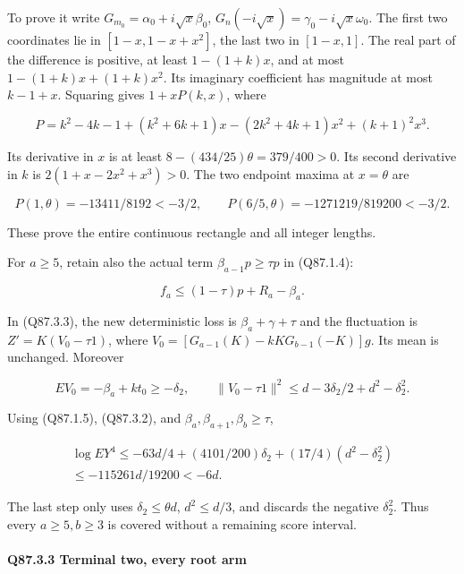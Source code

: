 To prove it write \(G_{m_0}=\allowbreak \alpha_0+i\sqrt x\beta_0\),
\(G_n(-i\sqrt x)=\allowbreak \gamma_0-i\sqrt x\omega_0\).
The first two coordinates lie in \([1-x,\allowbreak  1-x+x^2]\), the last
two in \([1-x,\allowbreak  1]\). The real part of the difference is positive,
at least \(1-(1+k)x\), and at most
\(1-(1+k)x+(1+k)x^2\). Its imaginary coefficient has magnitude
at most \(k-1+x\). Squaring gives \(1+xP(k,\allowbreak  x)\), where

\[
 P=k^2-4k-1+(k^2+6k+1)x
 -(2k^2+4k+1)x^2+(k+1)^2x^3.
\]

Its derivative in \(x\) is at least
\(8-(434/25)\theta=\allowbreak 379/400>\allowbreak 0\). Its second derivative in \(k\)
is \(2(1+x-2x^2+x^3)>\allowbreak 0\). The two endpoint maxima at \(x=\allowbreak \theta\)
are

\[
 P(1,\theta)=-13411/8192<-3/2,\qquad
 P(6/5,\theta)=-1271219/819200<-3/2.
\]

These prove the entire continuous rectangle and all integer lengths.

For \(a\ge\allowbreak 5\), retain also the actual term
\(\beta_{a-1}p\ge\allowbreak \tau p\) in (Q87.1.4):

\[
 f_a\le(1-\tau)p+R_a-\beta_a.
\]

In (Q87.3.3), the new deterministic loss is \(\beta_a+\gamma+\tau\)
and the fluctuation is \(Z'=\allowbreak K(V_0-\tau1)\), where
\(V_0=\allowbreak [G_{a-1}(K)-kKG_{b-1}(-K)]g\).
Its mean is unchanged. Moreover

\[
 EV_0=-\beta_a+kt_0\ge-\delta_2,\qquad
 \|V_0-\tau1\|^2\le d-3\delta_2/2+d^2-\delta_2^2.
\]

Using (Q87.1.5), (Q87.3.2), and \(\beta_a,\allowbreak  \beta_{a+1},\allowbreak  \beta_b\ge\allowbreak \tau\),

\[
\begin{gathered}
\log EY^4\le-63d/4+(4101/200)\delta_2+(17/4)(d^2-\delta_2^2)\\
\le-115261d/19200<-6d.
\end{gathered}\tag{Q87.3.6}\label{eq:Q87:3.6}
\]

The last step only uses \(\delta_2\le\allowbreak \theta d\), \(d^2\le\allowbreak  d/3\),
and discards the negative \(\delta_2^2\). Thus every \(a\ge\allowbreak 5,\allowbreak  b\ge\allowbreak 3\)
is covered without a remaining score interval.

\paragraph{Q87.3.3 Terminal two, every root arm}\label{part:Q87.3.3}

